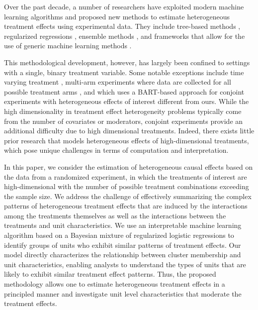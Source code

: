 \documentclass[11pt]{article}
\begin{document}
Over the past decade, a number of researchers have exploited modern
machine learning algorithms and proposed new methods to estimate
heterogeneous treatment effects using experimental data.  They include
tree-based methods
\citep[e.g.,][]{imai:stra:11,athe:imbe:16,wage:athe:18,hahn:murr:carv:20},
regularized regressions \citep[e.g.,][]{imai:ratk:13, tian:etal:14,
  kunz:etal:19}, ensemble methods \citep[e.g.,][]{vand:rose:11,
  grim:mess:west:17}, and frameworks that allow for the use of
generic machine learning methods
\citep[e.g.,][]{cher:etal:19,imai:li:21}.

This methodological development, however, has largely been confined to
settings with a single, binary treatment variable.
Some notable
exceptions include time varying treatment
\citep[e.g.,][]{almirall2014time}, multi-arm experiments where data
are collected for all possible treatment arms
\citep[e.g.,][]{imai:ratk:13}, and \cite{robinsondetect} which uses a
BART-based approach for conjoint experiments with heterogeneous
effects of interest different from ours.  While the high
dimensionality in treatment effect heterogeneity problems typically
come from the number of covariates or moderators, conjoint experiments
provide an additional difficulty due to high dimensional treatments.
Indeed, there exists little prior research that models heterogeneous
effects of high-dimensional treatments, which pose unique challenges
in terms of computation and interpretation.

In this paper, we consider the estimation of heterogeneous causal
effects based on the data from a randomized experiment, in which the
treatments of interest are high-dimensional with the number of
possible treatment combinations exceeding the sample size.  We address
the challenge of effectively summarizing the complex patterns of
heterogeneous treatment effects that are induced by the interactions
among the treatments themselves as well as the interactions between
the treatments and unit characteristics.  We use an interpretable
machine learning algorithm based on a Bayesian mixture of regularized
logistic regressions to identify groups of units who exhibit similar
patterns of treatment effects.  Our model directly characterizes the
relationship between cluster membership and unit characteristics,
enabling analysts to understand the types of units that are likely to
exhibit similar treatment effect patterns.  Thus, the proposed
methodology allows one to estimate heterogeneous treatment effects in
a principled manner and investigate unit level characteristics that
moderate the treatment effects.
\end{document}
